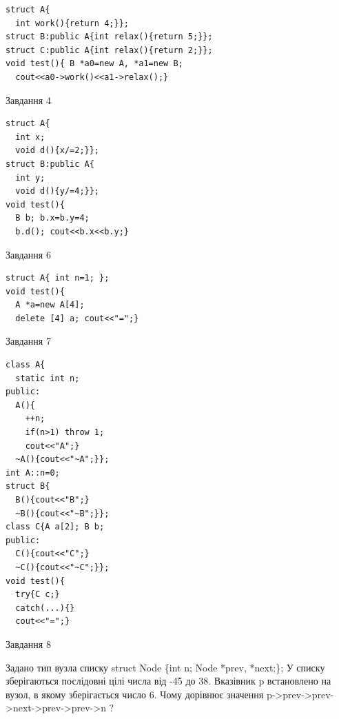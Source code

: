 \documentclass[12pt, ukrainian]{article}
\begin{document}
{{{{{\begin{minipage}[t]{11cm}
\begin{verbatim}
struct A{
  int work(){return 4;}}; 
struct B:public A{int relax(){return 5;}};
struct C:public A{int relax(){return 2;}};
void test(){ B *a0=new A, *a1=new B;
  cout<<a0->work()<<a1->relax();}
\end{verbatim}            


\end{minipage}
\vline \hspace{8mm}
\begin{minipage}[t]{7cm}
               
{\begin{center}Завдання {4}\end{center}}
\vspace{-6mm}

\begin{verbatim}
struct A{
  int x;
  void d(){x/=2;}};
struct B:public A{
  int y;
  void d(){y/=4;}};
void test(){
  B b; b.x=b.y=4;
  b.d(); cout<<b.x<<b.y;}
\end{verbatim}            


               
{\begin{center}Завдання {6}\end{center}}
\vspace{-6mm}

\begin{verbatim}
struct A{ int n=1; };
void test(){
  A *a=new A[4]; 
  delete [4] a; cout<<"=";}
\end{verbatim}            


               
{\begin{center}Завдання {7}\end{center}}
\vspace{-6mm}

\begin{verbatim}
class A{
  static int n;
public:
  A(){
    ++n; 
    if(n>1) throw 1;
    cout<<"A";}
  ~A(){cout<<"~A";}};
int A::n=0;
struct B{
  B(){cout<<"B";}
  ~B(){cout<<"~B";}};
class C{A a[2]; B b;
public:
  C(){cout<<"C";}
  ~C(){cout<<"~C";}};
void test(){
  try{C c;} 
  catch(...){} 
  cout<<"=";}
\end{verbatim}            


\end{minipage}
               
{\begin{center}Завдання {8}\end{center}}
\vspace{-6mm}
Задано тип вузла списку
struct Node \{int n; Node *prev, *next;\};
У списку зберігаються послідовні цілі числа від -45 до 38. Вказівник p встановлено на вузол, в якому зберігається число 6.
Чому дорівнює значення p->prev->prev->next->prev->prev->n ?\par

}}}}}
\end{document}
